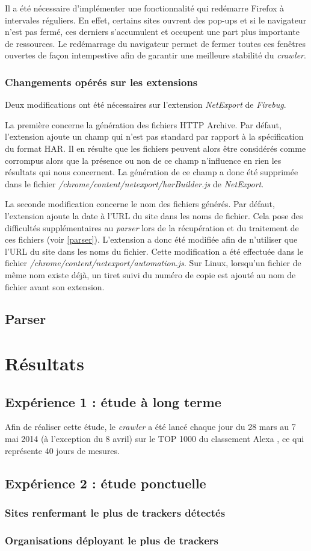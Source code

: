 Il a été nécessaire d'implémenter une fonctionnalité qui redémarre Firefox à intervales réguliers. En effet, certains sites ouvrent des pop-ups et si le navigateur n'est pas fermé, ces derniers s'accumulent et occupent une part plus importante de ressources. Le redémarrage du navigateur permet de fermer toutes ces fenêtres ouvertes de façon intempestive afin de garantir une meilleure stabilité du \textit{crawler}.

\subsubsection{Changements opérés sur les extensions}
Deux modifications ont été nécessaires sur l'extension \textit{NetExport} de \textit{Firebug}.

La première concerne la génération des fichiers HTTP Archive. Par défaut, l'extension ajoute un champ qui n'est pas standard par rapport à la spécification du format HAR. Il en résulte que les fichiers peuvent alors être considérés comme corrompus alors que la présence ou non de ce champ n'influence en rien les résultats qui nous concernent. La génération de ce champ a donc été supprimée dans le fichier \textit{/chrome/content/netexport/harBuilder.js} de \textit{NetExport}.

La seconde modification concerne le nom des fichiers générés. Par défaut, l'extension ajoute la date à l'URL du site dans les noms de fichier. Cela pose des difficultés supplémentaires au \textit{parser} lors de la récupération et du traitement de ces fichiers (voir \autoref{parser}). L'extension a donc été modifiée afin de n'utiliser que l'URL du site dans les noms du fichier. Cette modification a été effectuée dans le fichier \textit{/chrome/content/netexport/automation.js}. Sur Linux, lorsqu'un fichier de même nom existe déjà, un tiret suivi du numéro de copie est ajouté au nom de fichier avant son extension.

\subsection{Parser}
\label{parser}

\section{Résultats}

\subsection{Expérience 1 : étude à long terme}
Afin de réaliser cette étude, le \textit{crawler} a été lancé chaque jour du 28 mars au 7 mai 2014 (à l'exception du 8 avril) sur le TOP 1000 du classement Alexa \cite{AlexaTop}, ce qui représente 40 jours de mesures.

\subsection{Expérience 2 : étude ponctuelle}

\subsubsection{Sites renfermant le plus de trackers détectés}

\subsubsection{Organisations déployant le plus de trackers}
